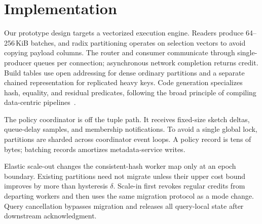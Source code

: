 \section{Implementation}
\label{sec:implementation}

Our prototype design targets a vectorized execution engine.  Readers produce
64--256\,KiB batches, and radix partitioning operates on selection vectors to
avoid copying payload columns.  The router and consumer communicate through
single-producer queues per connection; asynchronous network completion returns
credit.  Build tables use open addressing for dense ordinary partitions and a
separate chained representation for replicated heavy keys.  Code generation
specializes hash, equality, and residual predicates, following the broad
principle of compiling data-centric pipelines~\cite{neumann2011efficient}.

The policy coordinator is off the tuple path.  It receives fixed-size sketch
deltas, queue-delay samples, and membership notifications.  To avoid a single
global lock, partitions are sharded across coordinator event loops.  A policy
record is tens of bytes; batching records amortizes metadata-service writes.

Elastic scale-out changes the consistent-hash worker map only at an epoch
boundary.  Existing partitions need not migrate unless their upper cost bound
improves by more than hysteresis $\delta$.  Scale-in first revokes regular
credits from departing workers and then uses the same migration protocol as a
mode change.  Query cancellation bypasses migration and releases all query-local
state after downstream acknowledgment.
